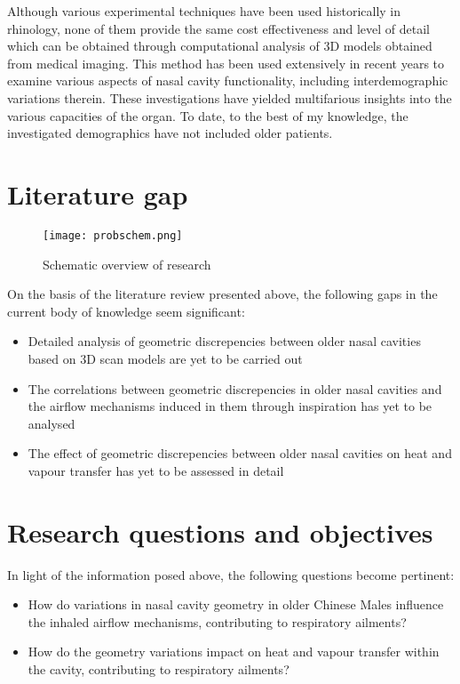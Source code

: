 Although various experimental techniques have been used historically in rhinology, none of them provide the same cost effectiveness and level of detail which can be obtained through computational analysis of 3D models obtained from medical imaging. This method has been used extensively in recent years to examine various aspects of nasal cavity functionality, including interdemographic variations therein. These investigations have yielded multifarious insights into the various capacities of the organ. To date, to the best of my knowledge, the investigated demographics have not included older patients.

\section{Literature gap}

\begin{figure}
  \centering
  \texttt{[image: probschem.png]}
  \caption{Schematic overview of research}\label{fig:prbschm}
\centering
\end{figure}

On the basis of the literature review presented above, the following gaps in the current body of knowledge seem significant:

\begin{itemize}

  \item Detailed analysis of geometric discrepencies between older nasal cavities based on 3D scan models are yet to be carried out

  \item The correlations between geometric discrepencies in older nasal cavities and the airflow mechanisms induced in them through inspiration has yet to be analysed

  \item The effect of geometric discrepencies between older nasal cavities on heat and vapour transfer has yet to be assessed in detail

\end{itemize}
\section{Research questions and objectives}

In light of the information posed above, the following questions become pertinent:

\begin{itemize}

  \item How do variations in nasal cavity geometry in older Chinese Males influence the inhaled airflow mechanisms, contributing to respiratory ailments?

  \item How do the geometry variations impact on heat and vapour transfer within the cavity, contributing to respiratory ailments?

\end{itemize}

